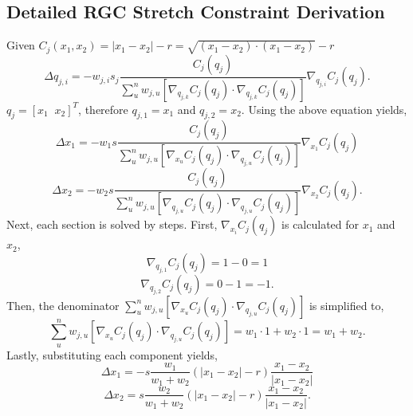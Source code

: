 \documentclass[12pt, letterpaper]{article}
\begin{document}
\subsection{Detailed RGC Stretch Constraint Derivation}
Given $C_j(x_{1},x_{2}) = |x_{1}-x_{2}|-r = \sqrt{(x_{1}-x_{2}) \cdot (x_{1}-x_{2})} - r $
$$ \Delta q_{j,i} = -w_{j,i} s_j \frac{C_j(q_j)}{\sum\limits^{n}_{u} w_{j,u}[ \nabla_{q_{j,k}}C_j(q_j) \cdot \nabla_{q_{j,k}}C_j(q_j)]} \nabla_{q_{j,i}}C_j(q_j).$$
$q_j = [x_1\;\;x_2]^T$, therefore $q_{j,1} = x_1$ and $q_{j,2} = x_2$. Using the above equation yields, 
$$\Delta x_{1} = -w_{1} s \frac{C_j(q_j)}{\sum\limits^{n}_{u} w_{j,u}[ \nabla_{x_{u}}C_j(q_j) \cdot \nabla_{q_{j,u}}C_j(q_j)]}\nabla_{x_{1}}C_j(q_j)$$ 
 $$\Delta x_{2} = -w_{2} s \frac{C_j(q_j)}{\sum\limits^{n}_{u} w_{j,u}[ \nabla_{q_{j,u}}C_j(q_j) \cdot \nabla_{q_{j,u}}C_j(q_j)]}\nabla_{x_{2}}C_j(q_j).$$
Next, each section is solved by steps. First, $\nabla_{x_{i}}C_j(q_j)$ is calculated for $x_1$ and $x_2$,
$$ \nabla_{q_{j,1}}C_j(q_j) = 1 - 0 = 1$$ 
$$\nabla_{q_{j,2}}C_j(q_j) = 0 - 1 = -1.$$
Then, the denominator $\sum\limits^{n}_{u} w_{j,u}[ \nabla_{x_{u}}C_j(q_j) \cdot \nabla_{q_{j,u}}C_j(q_j)]$ is simplified to, 
$$\sum\limits^{n}_{u} w_{j,u}[ \nabla_{x_{u}}C_j(q_j) \cdot \nabla_{q_{j,u}}C_j(q_j)] = w_{1} \cdot 1 + w_{2} \cdot 1 = w_{1} + w_{2}. $$
Lastly, substituting each component yields,
$$\Delta x_{1} = -s\frac{w_{1}}{w_{1}+w_{2}}(|x_{1} - x_{2}|-r) \frac{x_{1} - x_{2}}{|x_{1} - x_{2}|}$$ 
$$\Delta x_{2} = s\frac{w_{2}}{w_{1}+w_{2}}(|x_{1} - x_{2}|-r) \frac{x_{1} - x_{2}}{|x_{1} - x_{2}|}.$$


\end{document}
